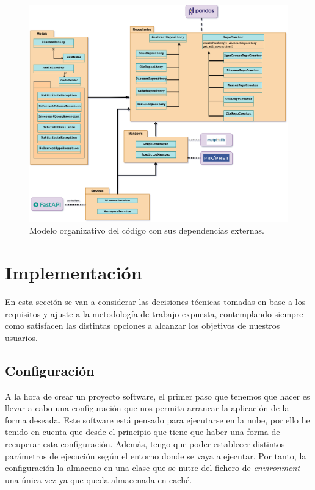 \FloatBarrier
\begin{figure}[h]
	\centering	
	\includegraphics[width=\textwidth]{doc/logos/imgs/arquitectonico.png}
	\caption{ Modelo organizativo del código con sus dependencias externas. }
    \label{fig:worst_f_value}
\end{figure}
\FloatBarrier


\section{Implementación}
En esta sección se van a considerar las decisiones técnicas tomadas en base a los
requisitos y ajuste a la metodología de trabajo expuesta, contemplando siempre como
satisfacen las distintas opciones a alcanzar los objetivos de nuestros usuarios.

\subsection{Configuración}
\label{sec:config}
A la hora de crear un proyecto software, el primer paso que tenemos que hacer es llevar a
cabo una configuración que nos permita arrancar la aplicación de la forma deseada. Este
software está pensado para ejecutarse en la nube, por ello he tenido en cuenta que desde
el principio que tiene que haber una forma de recuperar esta configuración. Además, tengo
que poder establecer distintos parámetros de ejecución según el entorno donde se vaya a
ejecutar. Por tanto, la configuración la almaceno en una clase que se nutre del fichero de
\textit{environment} una única vez ya que queda almacenada en caché. 

